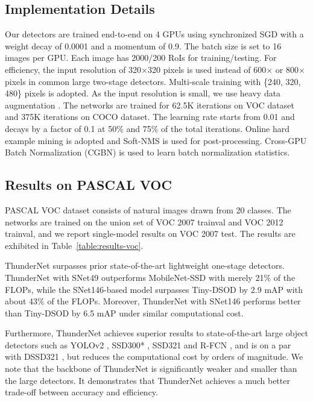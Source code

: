 \subsection{Implementation Details}
\label{section:implementation-details}

Our detectors are trained end-to-end on 4 GPUs using synchronized SGD with a weight decay of 0.0001 and a momentum of 0.9.
The batch size is set to 16 images per GPU.
Each image has 2000/200 RoIs for training/testing.
For efficiency, the input resolution of 320$\times$320 pixels is used instead of 600$\times$ or 800$\times$ pixels in common large two-stage detectors.
Multi-scale training with \{240, 320, 480\} pixels is adopted.
As the input resolution is small, we use heavy data augmentation \cite{liu2016ssd}.
The networks are trained for 62.5K iterations on VOC dataset and 375K iterations on COCO dataset.
The learning rate starts from 0.01 and decays by a factor of 0.1 at 50\% and 75\% of the total iterations.
Online hard example mining \cite{shrivastava2016training} is adopted and Soft-NMS \cite{bodla2017soft} is used for post-processing.
Cross-GPU Batch Normalization (CGBN) \cite{peng2018megdet} is used to learn batch normalization statistics.

\subsection{Results on PASCAL VOC}

PASCAL VOC dataset consists of natural images drawn from 20 classes.
The networks are trained on the union set of VOC 2007 trainval and VOC 2012 trainval, and we report single-model results on VOC 2007 test.
The results are exhibited in Table~\ref{table:results-voc}.

ThunderNet surpasses prior state-of-the-art lightweight one-stage detectors.
ThunderNet with SNet49 outperforms MobileNet-SSD with merely 21\% of the FLOPs, while the SNet146-based model surpasses Tiny-DSOD by 2.9 mAP with about 43\% of the FLOPs.
Moreover, ThunderNet with SNet146 performs better than Tiny-DSOD by 6.5 mAP under similar computational cost.

Furthermore, ThunderNet achieves superior results to state-of-the-art large object detectors such as YOLOv2 \cite{redmon2017yolo9000}, SSD300* \cite{liu2016ssd}, SSD321 \cite{liu2016ssd} and R-FCN \cite{dai2016r}, and is on a par with DSSD321 \cite{fu2017dssd}, but reduces the computational cost by orders of magnitude.
We note that the backbone of ThunderNet is significantly weaker and smaller than the large detectors.
It demonstrates that ThunderNet achieves a much better trade-off between accuracy and efficiency.

